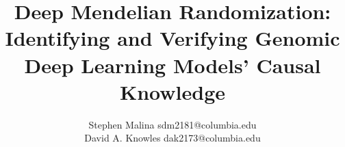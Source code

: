 \documentclass[twoside,11pt]{article}
\begin{document}
\title{Deep Mendelian Randomization: Identifying and Verifying Genomic Deep Learning Models' Causal Knowledge}

\author{\name Stephen Malina \email sdm2181@columbia.edu \\
       \AND
       \name David A. Knowles \email dak2173@columbia.edu}
       


\maketitle



%




\newpage

\appendix

\vskip 0.2in

\end{document}
